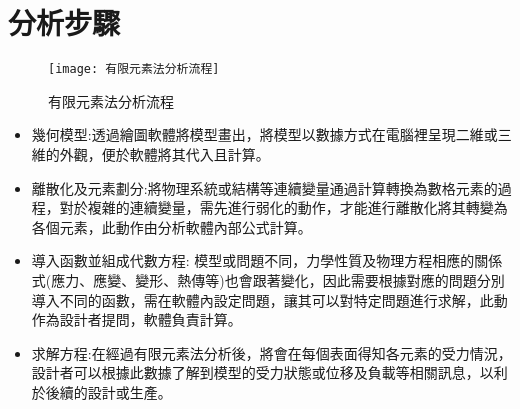 \section{分析步驟}
\begin{figure}[hbt!]
\begin{center}
\texttt{[image: 有限元素法分析流程]}
\caption{\Large 有限元素法分析流程}\label{有限元素法分析流程}
\end{center}
\end{figure}
\begin{itemize}
\item 幾何模型:透過繪圖軟體將模型畫出，將模型以數據方式在電腦裡呈現二維或三維的外觀，便於軟體將其代入且計算。
\item 離散化及元素劃分:將物理系統或結構等連續變量通過計算轉換為數格元素的過程，對於複雜的連續變量，需先進行弱化的動作，才能進行離散化將其轉變為各個元素，此動作由分析軟體內部公式計算。
\item 導入函數並組成代數方程: 模型或問題不同，力學性質及物理方程相應的關係式(應力、應變、變形、熱傳等)也會跟著變化，因此需要根據對應的問題分別導入不同的函數，需在軟體內設定問題，讓其可以對特定問題進行求解，此動作為設計者提問，軟體負責計算。
\item 求解方程:在經過有限元素法分析後，將會在每個表面得知各元素的受力情況，設計者可以根據此數據了解到模型的受力狀態或位移及負載等相關訊息，以利於後續的設計或生產。
\end{itemize}
\newpage
